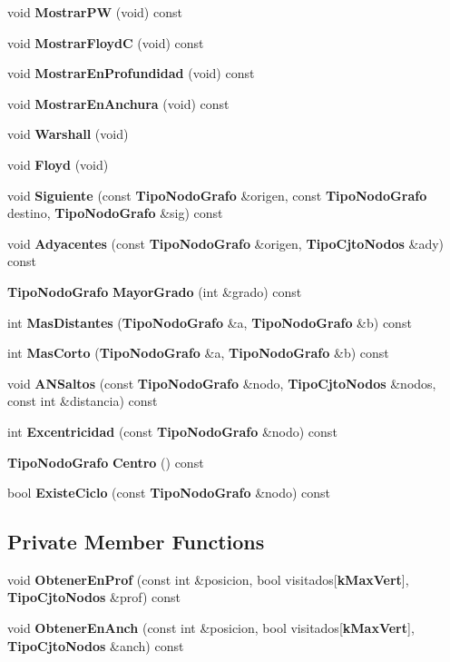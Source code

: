 \begin{CompactItemize}
\item 
void {\bf MostrarPW} (void) const
\item 
void {\bf MostrarFloydC} (void) const
\item 
void {\bf MostrarEnProfundidad} (void) const
\item 
void {\bf MostrarEnAnchura} (void) const
\item 
void {\bf Warshall} (void)
\item 
void {\bf Floyd} (void)
\item 
void {\bf Siguiente} (const {\bf TipoNodoGrafo} \&origen, const {\bf TipoNodoGrafo} destino, {\bf TipoNodoGrafo} \&sig) const 
\item 
void {\bf Adyacentes} (const {\bf TipoNodoGrafo} \&origen, {\bf TipoCjtoNodos} \&ady) const 
\item 
{\bf TipoNodoGrafo} {\bf MayorGrado} (int \&grado) const
\item 
int {\bf MasDistantes} ({\bf TipoNodoGrafo} \&a, {\bf TipoNodoGrafo} \&b) const
\item 
int {\bf MasCorto} ({\bf TipoNodoGrafo} \&a, {\bf TipoNodoGrafo} \&b) const
\item 
void {\bf ANSaltos} (const {\bf TipoNodoGrafo} \&nodo, {\bf TipoCjtoNodos} \&nodos, const int \&distancia) const
\item 
int {\bf Excentricidad} (const {\bf TipoNodoGrafo} \&nodo) const
\item 
{\bf TipoNodoGrafo} {\bf Centro} () const
\item 
bool {\bf ExisteCiclo} (const {\bf TipoNodoGrafo} \&nodo) const
\end{CompactItemize}
\subsection*{Private Member Functions}
\begin{CompactItemize}
\item 
void {\bf ObtenerEnProf} (const int \&posicion, bool visitados[{\bf kMaxVert}], {\bf TipoCjtoNodos} \&prof) const
\item 
void {\bf ObtenerEnAnch} (const int \&posicion, bool visitados[{\bf kMaxVert}], {\bf TipoCjtoNodos} \&anch) const
\end{CompactItemize}
